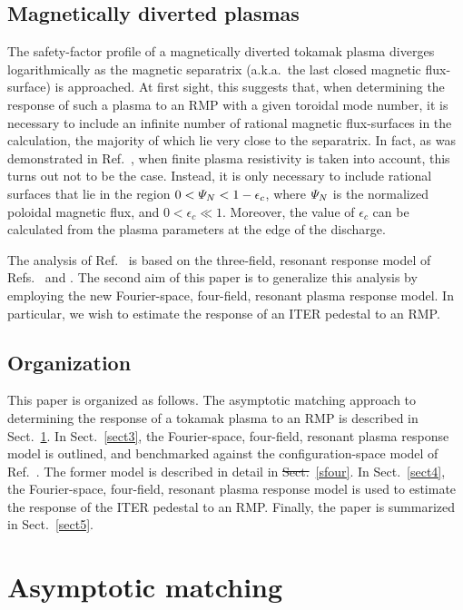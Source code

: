 \documentclass[12pt,prb,aps]{revtex4-1}
\providecommand{\DIFadd}[1]{{\protect\color{blue}\uwave{#1}}} %
\providecommand{\DIFdel}[1]{{\protect\color{red}\sout{#1}}}                      %
\providecommand{\DIFaddbegin}{} %
\providecommand{\DIFaddend}{} %
\providecommand{\DIFdelbegin}{} %
\providecommand{\DIFdelend}{} %
\begin{document}
 \subsection{Magnetically diverted plasmas}
 The safety-factor profile of a magnetically diverted tokamak plasma diverges logarithmically as the magnetic separatrix 
(a.k.a.\ the last closed magnetic flux-surface) is approached. At first sight, this suggests that, when determining the response of such a plasma to an RMP 
with a given toroidal mode number, it is necessary to include an infinite number of rational magnetic flux-surfaces in the calculation, the
majority of which lie  very close to the separatrix. In fact, as was demonstrated in Ref.~, when finite plasma resistivity is taken into account, this turns out not to be the case. 
Instead, it is only necessary to include rational surfaces that
lie in the region $0<{\mit\Psi}_N<1-\epsilon_c$, where ${\mit\Psi}_N$ is the normalized poloidal magnetic flux, and
$0<\epsilon_c\ll 1$. Moreover, the value of $\epsilon_c$ can be calculated from the plasma parameters at the edge of the discharge. 

The analysis of Ref.~ is based on the three-field, resonant response model of Refs.~ and .
The second aim of this paper is to generalize this analysis  by employing  the new Fourier-space, four-field, resonant plasma response model. In particular, we wish to estimate the response of
an ITER pedestal to an RMP. 

\subsection{Organization}
This paper is organized as follows. The asymptotic matching approach to determining the response of a tokamak plasma to an RMP is described in Sect.~\ref{sect1}. 
In Sect.~\ref{sect3}, the Fourier-space, four-field, resonant plasma response model is outlined, and benchmarked against the configuration-space model of Ref.~. The former model is described in detail in \DIFdelbegin \DIFdel{Sect.}\DIFdelend \DIFaddbegin \DIFadd{Appendix}\DIFaddend ~\ref{sfour}. In Sect.~\ref{sect4}, the Fourier-space, four-field, resonant plasma response model is used to estimate the response of the ITER pedestal to an RMP. Finally, the paper is
summarized in Sect.~\ref{sect5}. 

\section{Asymptotic matching}\label{sect1}
\end{document}
